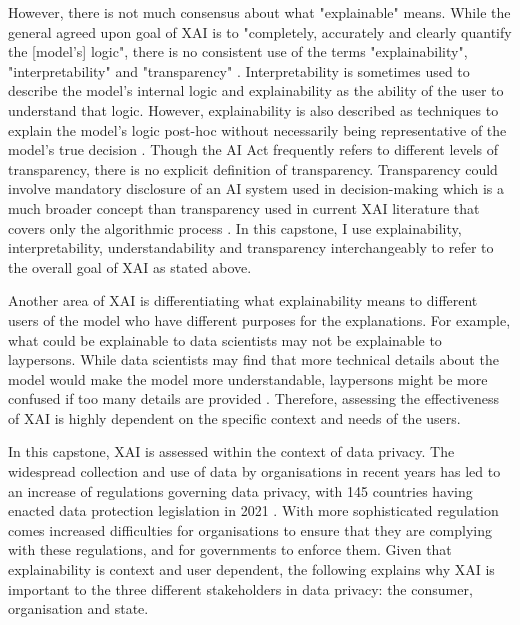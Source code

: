 However, there is not much consensus about what "explainable" means. While the general agreed upon goal of XAI is to "completely, accurately and clearly quantify the [model's] logic", there is no consistent use of the terms "explainability", "interpretability" and "transparency" \cite{danilevsky2020}. Interpretability is sometimes used to describe the model's internal logic and explainability as the ability of the user to understand that logic. However, explainability is also described as techniques to explain the model's logic post-hoc without necessarily being representative of the model's true decision \cite{rosenfeld2021}. Though the AI Act frequently refers to different levels of transparency, there is no explicit definition of transparency. Transparency could involve mandatory disclosure of an AI system used in decision-making which is a much broader concept than transparency used in current XAI literature that covers only the algorithmic process \cite{gyevnar2023}. In this capstone, I use explainability, interpretability, understandability and transparency interchangeably to refer to the overall goal of XAI as stated above.

Another area of XAI is differentiating what explainability means to different users of the model who have different purposes for the explanations. For example, what could be explainable to data scientists may not be explainable to laypersons. While data scientists may find that more technical details about the model would make the model more understandable, laypersons might be more confused if too many details are provided \cite{rosenfeld2021}. Therefore, assessing the effectiveness of XAI is highly dependent on the specific context and needs of the users. 

In this capstone, XAI is assessed within the context of data privacy. The widespread collection and use of data by organisations in recent years has led to an increase of regulations governing data privacy, with 145 countries having enacted data protection legislation in 2021 \cite{gstrein2022}. With more sophisticated regulation comes increased difficulties for organisations to ensure that they are complying with these regulations, and for governments to enforce them. Given that explainability is context and user dependent, the following explains why XAI is important to the three different stakeholders in data privacy: the consumer, organisation and state.

